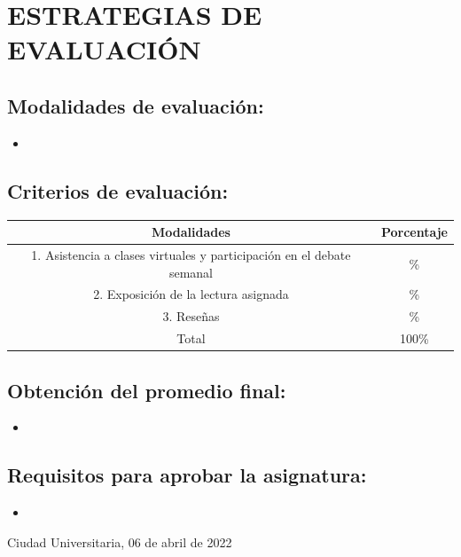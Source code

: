 \documentclass[a4paper]{article}
\begin{document}
\section {ESTRATEGIAS DE EVALUACIÓN}
\subsection {Modalidades de evaluación:}
\begin{itemize}
\item 
\end{itemize}
\subsection {Criterios de evaluación:}
\begin{table}[ht]
\centering
\begin{tabular}{|c|c|}
\hline
\textbf{Modalidades} & \textbf{Porcentaje} \\ 
\hline
1. Asistencia a clases virtuales y participación en el debate semanal & \% \\ 
\hline
2. Exposición de la lectura asignada & \% \\ 
\hline
3. Reseñas & \% \\ 
\hline
Total & 100\% \\ 
\hline 
\end{tabular}
\end{table}
\subsection {Obtención del promedio final:}
\begin{itemize}
\item 
\end{itemize}
\subsection {Requisitos para aprobar la asignatura:}
\begin{itemize}
\item 
\end{itemize}
\begin{flushright}
Ciudad Universitaria, 06 de abril de 2022
\end{flushright}
\end{document}
